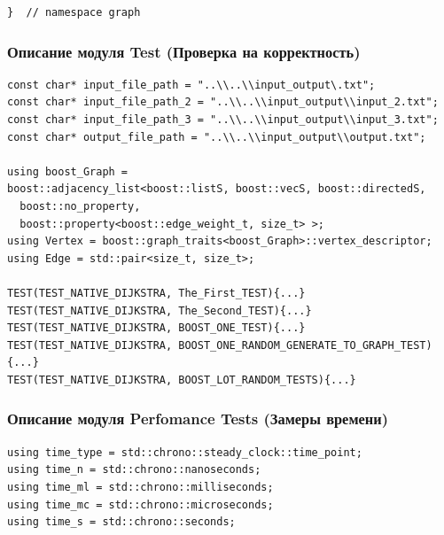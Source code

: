 \begin{text}
\begin{lstlisting}[breaklines=true]
}  // namespace graph
\end{lstlisting}
\newpage

\subsubsection{Описание модуля Test (Проверка на корректность)}

\begin{lstlisting}[breaklines=true]
const char* input_file_path = "..\\..\\input_output\.txt";
const char* input_file_path_2 = "..\\..\\input_output\\input_2.txt";
const char* input_file_path_3 = "..\\..\\input_output\\input_3.txt";
const char* output_file_path = "..\\..\\input_output\\output.txt";

using boost_Graph =
boost::adjacency_list<boost::listS, boost::vecS, boost::directedS,
  boost::no_property,
  boost::property<boost::edge_weight_t, size_t> >;
using Vertex = boost::graph_traits<boost_Graph>::vertex_descriptor;
using Edge = std::pair<size_t, size_t>;

TEST(TEST_NATIVE_DIJKSTRA, The_First_TEST){...}
TEST(TEST_NATIVE_DIJKSTRA, The_Second_TEST){...}
TEST(TEST_NATIVE_DIJKSTRA, BOOST_ONE_TEST){...}
TEST(TEST_NATIVE_DIJKSTRA, BOOST_ONE_RANDOM_GENERATE_TO_GRAPH_TEST){...}
TEST(TEST_NATIVE_DIJKSTRA, BOOST_LOT_RANDOM_TESTS){...}
\end{lstlisting}
\newpage

\subsubsection{Описание модуля Perfomance Tests (Замеры времени)}
\begin{lstlisting}[breaklines=true]
using time_type = std::chrono::steady_clock::time_point;
using time_n = std::chrono::nanoseconds;
using time_ml = std::chrono::milliseconds;
using time_mc = std::chrono::microseconds;
using time_s = std::chrono::seconds;


\end{lstlisting}
\end{text}
